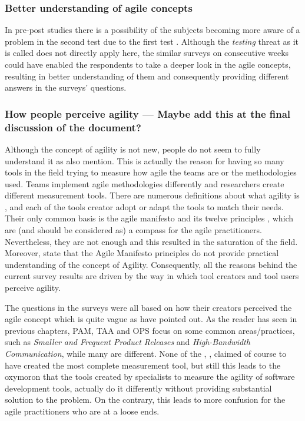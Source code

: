 \subsubsection{Better understanding of agile concepts}
In pre-post studies there is a possibility of the subjects becoming more aware of a problem in the second test due to the first test \cite{Campbell_Stanley}. Although the \textit{testing} threat as it is called does not directly apply here, the similar surveys on consecutive weeks could have enabled the respondents to take a deeper look in the agile concepts, resulting in better understanding of them and consequently providing different answers in the surveys' questions. 

\subsubsection{How people perceive agility --- Maybe add this at the final discussion of the document?}
Although the concept of agility is not new, people do not seem to fully understand it as \citet{Wang_Conboy} also mention. This is actually the reason for having so many tools in the field trying to measure how agile the teams are or the methodologies used. Teams implement agile methodologies differently and researchers create different measurement tools. There are numerous definitions about what agility is \cite{Kidd, Kara, Ramesh, agile_manufacturing}, and each of the tools creator adopt or adapt the tools to match their needs. Their only common basis is the agile manifesto \cite{beck2001agile} and its twelve principles \cite{agile_principles}, which are (and should be considered as) a compass for the agile practitioners. Nevertheless, they are not enough and this resulted in the saturation of the field. Moreover, \citet{conboy_fitzgerald} state that the Agile Manifesto principles do not provide practical understanding of the concept of Agility. Consequently, all the reasons behind the current survey results are driven by the way in which tool creators and tool users perceive agility.

The questions in the surveys were all based on how their creators perceived the agile concept which is quite vague as \citet{tsourveloudis} have pointed out. As the reader has seen in previous chapters, \ac{PAM}, \ac{TAA} and \ac{OPS} focus on some common areas/practices, such as  \textit{Smaller and Frequent Product Releases} and \textit{High-Bandwidth Communication}, while many are different. None of the \citet{sventha_dissertation}, \citet{pam}, \citet{Leffingwell} claimed of course to have created the most complete measurement tool, but still this leads to the oxymoron that the tools created by specialists to measure the agility of software development tools, actually do it differently without providing substantial solution to the problem. On the contrary, this leads to more confusion for the agile practitioners who are at a loose ends.

